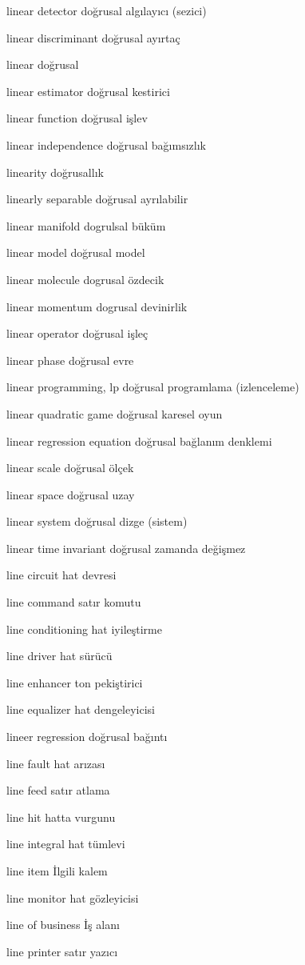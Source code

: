 \documentclass[12pt,fleqn]{article}\usepackage{../../common}
\begin{document}
linear detector doğrusal algılayıcı (sezici)

linear discriminant doğrusal ayırtaç

linear doğrusal

linear estimator doğrusal kestirici

linear function doğrusal işlev

linear independence doğrusal bağımsızlık

linearity doğrusallık

linearly separable doğrusal ayrılabilir

linear manifold dogrulsal büküm

linear model doğrusal model

linear molecule dogrusal özdecik

linear momentum dogrusal devinirlik

linear operator doğrusal işleç

linear phase doğrusal evre

linear programming, lp doğrusal programlama (izlenceleme)

linear quadratic game doğrusal karesel oyun

linear regression equation doğrusal bağlanım denklemi

linear scale doğrusal ölçek

linear space doğrusal uzay

linear system doğrusal dizge (sistem)

linear time invariant doğrusal zamanda değişmez

line circuit hat devresi

line command satır komutu

line conditioning hat iyileştirme

line driver hat sürücü

line enhancer ton pekiştirici

line equalizer hat dengeleyicisi

lineer regression doğrusal bağıntı

line fault hat arızası

line feed satır atlama

line hit hatta vurgunu

line integral hat tümlevi

line item İlgili kalem

line monitor hat gözleyicisi

line of business İş alanı

line printer satır yazıcı
\end{document}
